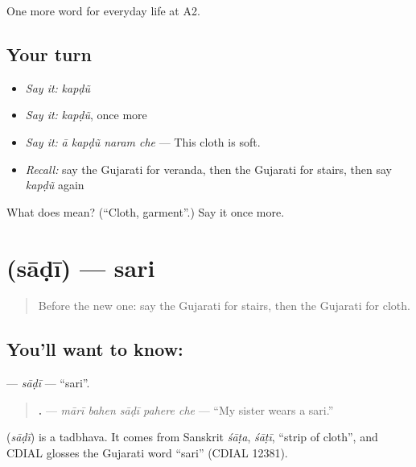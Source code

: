 \begin{grammarlens}[title={What you've built}]
One more word for everyday life at A2.
\end{grammarlens}

\subsection*{Your turn}
\begin{itemize}
\raggedright
  \item \emph{Say it:} \emph{kapḍũ}
  \item \emph{Say it:} \emph{kapḍũ}, once more
  \item \emph{Say it:} \emph{ā kapḍũ naram che} — This cloth is soft.
  \item \emph{Recall:} say the Gujarati for veranda, then the Gujarati for stairs, then say \emph{kapḍũ} again
\end{itemize}

\begin{tcolorbox}[breakable,colback=teal!4,colframe=teal!35!black,title={Before you move on}]
What does  mean? (\textquotedblleft{}Cloth, garment\textquotedblright{}.) Say it once more.
\end{tcolorbox}
\section[\texorpdfstring{\gu{સાડી} (sāḍī)}{સાડી (sāḍī)}]{ (sāḍī) — sari}

\label{lesson:GU-C154-sadi}



\begin{quote}
Before the new one: say the Gujarati for stairs, then the Gujarati for cloth.
\end{quote}

\subsection*{You'll want to know: }
\textbf{} — \emph{sāḍī} — \textquotedblleft{}sari\textquotedblright{}.

\begin{quote}
\textbf{    .} — \emph{mārī bahen sāḍī pahere che} — \textquotedblleft{}My sister wears a sari.\textquotedblright{}
\end{quote}

\begin{cousinweb}
\textbf{} (\emph{sāḍī}) is a tadbhava. It comes from Sanskrit \emph{śāṭa}, \emph{śāṭī}, \textquotedblleft{}strip of cloth\textquotedblright{}, and CDIAL glosses the Gujarati word \textquotedblleft{}sari\textquotedblright{} (CDIAL 12381).
\end{cousinweb}

